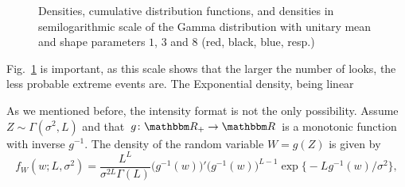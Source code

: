 \documentclass{beamer}
\begin{document}
\begin{frame}
\begin{figure}[hbt]
\centering
{}
\caption[Densities, cumulative distribution functions, and densities in semilogarithmic scale of the Gamma distribution with unitary mean and shape parameters $1$, $3$ and $8$]{Densities, cumulative distribution functions, and densities in semilogarithmic scale of the Gamma distribution with unitary mean and shape parameters $1$, $3$ and $8$ (red, black, blue, resp.)}\label{Fig:GammaDistribution}
\end{figure}


Fig.~\ref{Fig:GammaDistribution} is important, as this scale shows that the larger the number of looks, the less probable extreme events are.
The Exponential density, being linear

As we mentioned before, the intensity format is not the only possibility.
Assume $Z\sim\Gamma(\sigma^2,L)$ and that $g\colon\mathbbm R_+ \to \mathbbm R$ is a monotonic function with inverse $g^{-1}$.
The density of the random variable $W = g(Z)$ is given by 
\begin{equation}
f_W(w;L,\sigma^2) = \frac{L^L}{\sigma^{2L}\Gamma(L)} (g^{-1}(w)\big)' \big(g^{-1}(w)\big)^{L-1} 
	\exp\big\{ -L g^{-1}(w) / \sigma^2
	\big\},
	\label{eq:GammmaTransformed}
\end{equation}


\end{frame}
\end{document}
